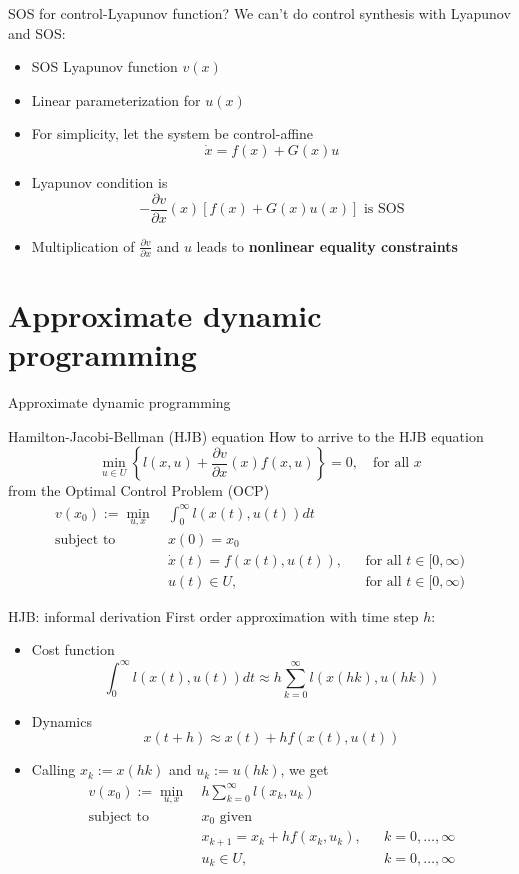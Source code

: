 \documentclass[aspectratio=169]{beamer}
\begin{document}
\begin{frame}{SOS for control-Lyapunov function?}
We can't do control synthesis with Lyapunov and SOS:
\begin{itemize}
\item
SOS Lyapunov function $v(x)$ 
\item
Linear parameterization for $u(x)$
\item
For simplicity, let the system be control-affine
$$
\dot x = f(x) + G(x) u
$$
\pause
\item
Lyapunov condition is
$$
- \frac{\partial v}{\partial x}(x) [f(x) + G(x) u(x)] \text{ is SOS}
$$
\item
Multiplication of $\frac{\partial v}{\partial x}$ and $u$ leads to \textbf{nonlinear equality constraints}
\end{itemize}
\end{frame}

\section{Approximate dynamic programming}
\begin{frame}
\huge
\centering
{\color{darkred} Approximate dynamic programming}
\end{frame}

\begin{frame}{Hamilton-Jacobi-Bellman (HJB) equation}
How to arrive to the HJB equation
$$
\min_{u \in U} \left\{ l(x, u) + \frac{\partial v}{\partial x} (x) f(x, u) \right\} = 0, \quad \text{for all } x
$$
from the Optimal Control Problem (OCP)
\begin{align*}
v(x_0) := \min_{u, x} \ &\int_0^\infty l(x(t), u(t)) dt \\
\text{subject to} \ & x(0) = x_0 \\
& \dot x(t) = f(x(t), u(t)), &&  \text{for all }t \in [0, \infty) \\
& u(t) \in U, &&  \text{for all }t \in [0, \infty)
\end{align*}
\end{frame}

\begin{frame}{HJB: informal derivation}
First order approximation with time step $h$:
\begin{itemize}
\item
Cost function
$$
\int_0^\infty l(x(t), u(t)) dt
\approx
h \sum_{k=0}^\infty l(x(hk), u(hk))
$$
\vspace{-3mm}
\item
Dynamics
$$
x(t+h) \approx x(t) + h f(x(t), u(t))
$$
\pause
\vspace{-3mm}
\item
Calling $x_k := x(hk)$ and $u_k := u(hk)$, we get
\begin{align*}
v(x_0) := \min_{u, x} \ &h \sum_{k=0}^\infty l(x_k, u_k) \\
\text{subject to} \ & x_0 \text{ given} \\
& x_{k+1} = x_k + h f(x_k, u_k), &&  k = 0, \ldots, \infty \\
& u_k \in U, &&  k = 0, \ldots, \infty
\end{align*}
\end{itemize}
\end{frame}
\end{document}
